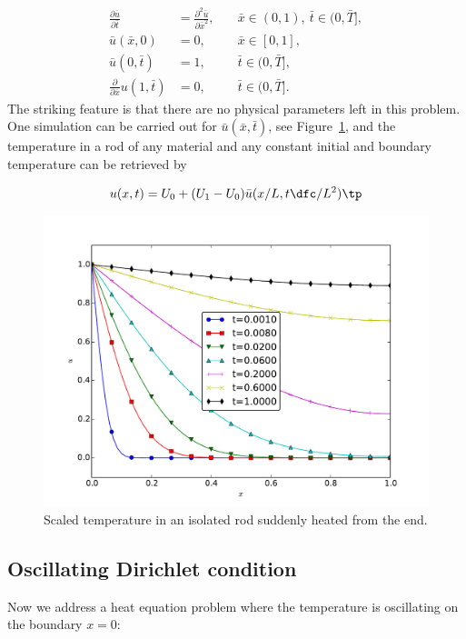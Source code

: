 \documentclass[graybox,envcountchap,sectrefs,final]{svmonodo}
\begin{document}
\begin{align}
\frac{\partial \bar u}{\partial \bar t} &=
\frac{\partial^2 \bar u}{\partial \bar x^2},
\quad &  \bar x\in (0,1),\ \bar t\in (0, \bar T],
\label{scale:heat:pde3:d}\\ 
\bar u(\bar x,0) &= 0,
\quad & \bar x\in [0,1],
\label{scale:heat:pde3:ic:u:d}\\ 
\bar u(0, \bar t) & = 1,
\quad  & \bar t\in (0, \bar T],
\label{scale:heat:pde3:bc:0:d}\\ 
\frac{\partial}{\partial \bar x} u(1, \bar t) & = 0,
\quad & \bar t\in (0, \bar T].
\label{scale:heat:pde3:bc:L:d}
\end{align}
The striking feature is that there are no physical parameters left in
this problem. One simulation can be carried out for $\bar u(\bar x,\bar t)$,
see Figure~\ref{scale:heat:pde3:fig},
and the temperature in a rod of any material and any constant initial and
boundary temperature can be retrieved by

\[ u(x,t) = U_0 + (U_1-U_0)\bar u(x/L, t\dfc/L^2)\tp\]


\begin{figure}[!ht]  %
  \centerline{\includegraphics[width=0.8\linewidth]{fig-scaling/diffusion_jump_BC.pdf}}
  \caption{
  Scaled temperature in an isolated rod suddenly heated from the end. \label{scale:heat:pde3:fig}
  }
\end{figure}



\subsection{Oscillating Dirichlet condition}

Now we address a heat equation problem where the temperature is
oscillating on the boundary $x=0$:
\end{document}
